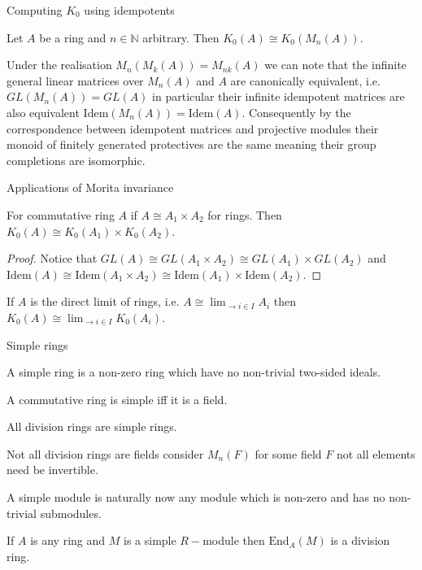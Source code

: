 \documentclass{beamer}
\newcommand{\N}{\mathbb{N}}
\begin{document}
\begin{frame}[allowframebreaks]{Computing $K_0$ using idempotents}
	\begin{corollary}\label{morita}
		Let $A$ be a ring and $n \in \N $ arbitrary. Then $K_0(A) \cong K_0(M_n(A))$.
	\end{corollary}
		Under the realisation $M_n(M_k(A))=M_{nk}(A) $ we can note that the infinite general linear matrices over $M_n(A) $ and $A$ are canonically equivalent, i.e. $GL(M_n(A)) = GL(A)$ in particular their infinite idempotent matrices are also equivalent $\mathrm{Idem}(M_n(A)) = \mathrm{Idem}(A)$. Consequently by the correspondence between idempotent matrices and projective modules their monoid of finitely generated protectives are the same meaning their group completions are isomorphic.
\end{frame}
\begin{frame}{Applications of Morita invariance}
	\begin{corollary}\label{propdirectproductofk0}
		For commutative ring $A$ if $A \cong A_1 \times A_2$ for rings. Then	$K_0(A) \cong K_0(A_1) \times K_0(A_2)$.
	\end{corollary}
	\begin{proof}
		Notice that $GL(A) \cong GL(A_1 \times A_2) \cong GL(A_1) \times GL(A_2)$ and $\mathrm{Idem}(A) \cong \mathrm{Idem}(A_1 \times A_2) \cong \mathrm{Idem}(A_1) \times \mathrm{Idem}(A_2)$.
	\end{proof}
	\begin{corollary}\label{directsystem}
		If $A$ is the direct limit of rings, i.e. $A\cong \lim_{\to i \in I} A_i $ then $K_0(A) \cong \lim_{\to i \in I} K_0(A_i)$.
	\end{corollary}
\end{frame}
\begin{frame}[allowframebreaks]{Simple rings}
	
	\begin{definition}
		A simple ring is a non-zero ring which have no non-trivial two-sided ideals.
	\end{definition}
	\begin{example}
		A commutative ring is simple iff it is a field.
	\end{example}
	\begin{example}
		All division rings are simple rings.
	\end{example}
	\newpage
	\begin{example}
		Not all division rings are fields consider $M_n(F)$ for some field $F$ not all elements need be invertible.
	\end{example}
	
	A simple module is naturally now any module which is non-zero and has no non-trivial submodules.
	
	\begin{lemma}\label{schurs}
		If $A$ is any ring and $M$ is a simple $R-$module then $\mathrm{End}_A(M)$ is a division ring.
	\end{lemma}
	
\end{frame}
\end{document}
